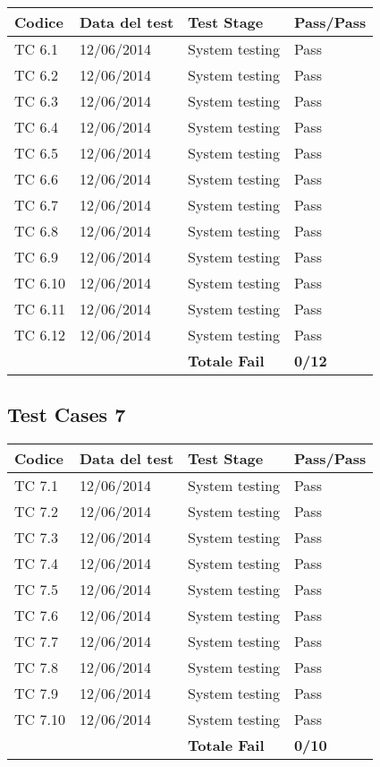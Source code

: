 \begin{tabular}{|p{3cm}|p{3cm}|p{3cm}|p{3cm}|}
	\hline
	\rowcolor{Gray}
	\textbf{Codice} & \textbf{Data del test} & \textbf{Test Stage} & \textbf{Pass/Pass}\tabularnewline
	\hline
	TC 6.1			& 12/06/2014 			& System testing		& Pass \tabularnewline
	\hline
	TC 6.2			& 12/06/2014 			& System testing		& Pass \tabularnewline
	\hline
	TC 6.3			& 12/06/2014 			& System testing		& Pass \tabularnewline
	\hline
	TC 6.4			& 12/06/2014 			& System testing		& Pass \tabularnewline
	\hline
	TC 6.5			& 12/06/2014 			& System testing		& Pass \tabularnewline
	\hline
	TC 6.6			& 12/06/2014 			& System testing		& Pass \tabularnewline
	\hline
	TC 6.7			& 12/06/2014 			& System testing		& Pass \tabularnewline
	\hline
	TC 6.8			& 12/06/2014 			& System testing		& Pass \tabularnewline
	\hline
	TC 6.9			& 12/06/2014 			& System testing		& Pass \tabularnewline
	\hline
	TC 6.10			& 12/06/2014 			& System testing		& Pass \tabularnewline
	\hline
	TC 6.11			& 12/06/2014 			& System testing		& Pass \tabularnewline
	\hline
	TC 6.12			& 12/06/2014 			& System testing		& Pass \tabularnewline
	\hline
					& 						& \textbf{Totale Fail}	& \textbf{0/12} \tabularnewline
	\hline
\end{tabular}

\subsection{Test Cases 7}

\begin{tabular}{|p{3cm}|p{3cm}|p{3cm}|p{3cm}|}
	\hline
	\rowcolor{Gray}
	\textbf{Codice} & \textbf{Data del test} & \textbf{Test Stage} & \textbf{Pass/Pass}\tabularnewline
	\hline
	TC 7.1			& 12/06/2014 			& System testing		& Pass \tabularnewline
	\hline
	TC 7.2			& 12/06/2014 			& System testing		& Pass \tabularnewline
	\hline
	TC 7.3			& 12/06/2014 			& System testing		& Pass \tabularnewline
	\hline
	TC 7.4			& 12/06/2014 			& System testing		& Pass \tabularnewline
	\hline
	TC 7.5			& 12/06/2014 			& System testing		& Pass \tabularnewline
	\hline
	TC 7.6			& 12/06/2014 			& System testing		& Pass \tabularnewline
	\hline
	TC 7.7			& 12/06/2014 			& System testing		& Pass \tabularnewline
	\hline
	TC 7.8			& 12/06/2014 			& System testing		& Pass \tabularnewline
	\hline
	TC 7.9			& 12/06/2014 			& System testing		& Pass \tabularnewline
	\hline
	TC 7.10			& 12/06/2014 			& System testing		& Pass \tabularnewline
	\hline
					& 						& \textbf{Totale Fail}	& \textbf{0/10} \tabularnewline
	\hline
\end{tabular}